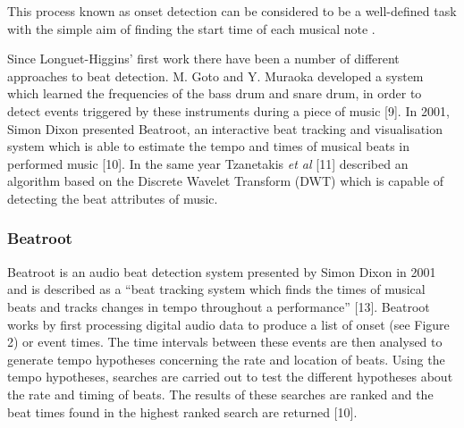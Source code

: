 \documentclass[a4paper, 11pt]{article}
\begin{document}
This process known as onset detection can be considered to be a well-defined task with the simple aim of finding the start time of each musical note \cite{dixon1}.


Since Longuet-Higgins' first work there have been a number of different approaches to beat detection. M. Goto and Y. Muraoka developed a system which learned the frequencies of the bass drum and snare drum, in order to detect events triggered by these instruments during a piece of music [9]. In 2001, Simon Dixon presented Beatroot, an interactive beat tracking and visualisation system which is able to estimate the tempo and times of musical beats in performed music [10]. In the same year Tzanetakis \textit{et al} [11] described an algorithm based on the Discrete Wavelet Transform (DWT) which is capable of detecting the beat attributes of music. 





\subsubsection{Beatroot}
Beatroot is an audio beat detection system presented by Simon Dixon in 2001 and is described as a ``beat tracking system which finds the times of musical beats and tracks changes in tempo throughout a performance'' [13]. Beatroot works by first processing digital audio data to produce a list of onset (see Figure 2) or event times. The time intervals between these events are then analysed to generate tempo hypotheses concerning the rate and location of beats. Using the tempo hypotheses, searches are carried out to test the different hypotheses about the rate and timing of beats. The results of these searches are ranked and the beat times found in the highest ranked search are returned [10]. 
\end{document}
